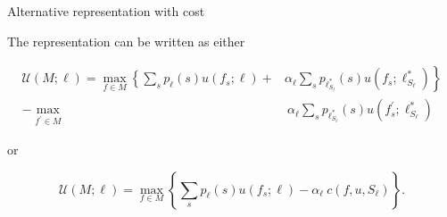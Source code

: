 \documentclass[usenames,dvipsnames,aspectratio=169,11pt,handout]{beamer}
\begin{document}
\begin{frame}{Alternative representation with cost}\label{cost}

	The representation can be written as either

	\[
		\begin{aligned}
			\mathcal{U} \left(M ; \ell \right) = \max _{f \in M}\left\{\sum_{s} p_{\ell} \left( s \right) u \left( f_{s} ; \ell \right) + \right. & \left. \alpha_{\ell} \sum_{s} p_{\ell^{*}_{S_{\ell}}} \left( s \right) u \left( f_{s} ; \ell^{*}_{S_{\ell}} \right) \right\} \\
			-\max _{f^{\prime} \in M}                                                                                                             & \: \alpha _{\ell} \sum_{s} p_{\ell^{*}_{S_{\ell}}} \left( s \right) u\left(f^{\prime}_{s} ; \ell^{*}_{S_{\ell}} \right)
		\end{aligned}
	\]

	or

	\[
		\mathcal{U} \left(M ; \ell \right) = \max _{f \in M}\left\{\sum_{s} p_{\ell} \left( s \right) u \left( f_{s} ; \ell \right) - \alpha_{\ell} \:  c \left( f, u, S_{\ell} \right) \right\} .
	\]

	\begin{flushright}
		\hyperlink{fullmodel}{}
	\end{flushright}

\end{frame}
\end{document}
